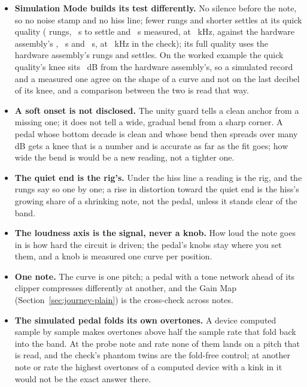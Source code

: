 \documentclass[11pt,a4paper]{article}
\begin{document}
\begin{itemize}
{  is silent.} It leaves no point and no count, unlike a rung the gate
  dropped; a short recording simply yields a shorter curve.
  \item \textbf{Simulation Mode builds its test differently.} No silence
  before the note, so no noise stamp and no hiss line; fewer rungs and
  shorter settles at its quick quality (\cmpSimInteractiveSteps{} rungs,
  \cmpSimInteractiveSettleS{}~s to settle and \cmpSimInteractiveMeasureS{}~s
  measured, at \cmpSimInteractiveRateKHz{}~kHz, against the hardware
  assembly's \cmpHardwareSteps{}, \cmpSettleS{}~s and \cmpMeasureS{}~s, at
  \cmpSampleRateKHz{}~kHz in the check); its full quality uses the hardware assembly's
  rungs and settles. On the worked example the quick quality's knee sits
  \cparitySimulationKneeGap{}~dB from the hardware assembly's, so a
  simulated record and a measured one agree on the shape of a curve and
  not on the last decibel of its knee, and a comparison between the two is
  read that way.
  \item \textbf{A soft onset is not disclosed.} The unity guard tells a
  clean anchor from a missing one; it does not tell a wide, gradual bend
  from a sharp corner. A pedal whose bottom decade is clean and whose bend
  then spreads over many dB gets a knee that is a number and is accurate as
  far as the fit goes; how wide the bend is would be a new reading, not a
  tighter one.
  \item \textbf{The quiet end is the rig's.} Under the hiss line a
  reading is the rig, and the rungs say so one by one; a rise in
  distortion toward the quiet end is the hiss's growing share of a
  shrinking note, not the pedal, unless it stands clear of the band.
  \item \textbf{The loudness axis is the signal, never a knob.} How loud
  the note goes in is how hard the circuit is driven; the pedal's knobs
  stay where you set them, and a knob is measured one curve per position.
  \item \textbf{One note.} The curve is one pitch; a pedal with a tone
  network ahead of its clipper compresses differently at another, and the
  Gain Map (Section~\ref{sec:journey-plain}) is the cross-check across
  notes.
  \item \textbf{The simulated pedal folds its own overtones.} A device
  computed sample by sample makes overtones above half the sample rate
  that fold back into the band. At the probe note and rate none of them
  lands on a pitch that is read, and the check's phantom twins are the
  fold-free control; at another note or rate the highest overtones of a
  computed device with a kink in it would not be the exact answer there.
\end{itemize}
\end{document}
